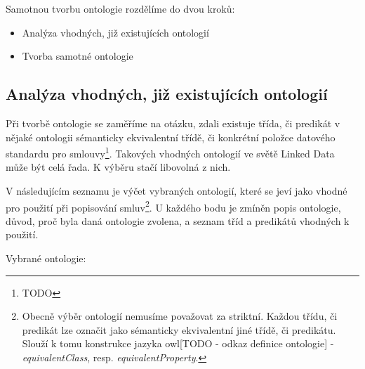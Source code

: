 \bigskip
\noindent
Samotnou tvorbu ontologie rozdělíme do dvou kroků:

\begin{itemize}
\item Analýza vhodných, již existujících ontologií
\item Tvorba samotné ontologie
\end{itemize}

\subsection{Analýza vhodných, již existujících ontologií}

Při tvorbě ontologie se zaměříme na otázku, zdali existuje třída, či predikát v nějaké ontologii sémanticky ekvivalentní třídě, či konkrétní položce datového standardu pro smlouvy\footnote{TODO}. Takových vhodných ontologií ve světě Linked Data může být celá řada. K výběru stačí libovolná z nich. 

V následujícím seznamu je výčet vybraných ontologií, které se jeví jako vhodné pro použití při popisování smluv\footnote{Obecně výběr ontologií nemusíme považovat za striktní. Každou třídu, či predikát lze označit jako sémanticky ekvivalentní jiné třídě, či predikátu. Slouží k tomu konstrukce jazyka owl[TODO - odkaz definice ontologie] - \textit{equivalentClass}, resp. \textit{equivalentProperty}.}. U každého bodu je zmíněn popis ontologie, důvod, proč byla daná ontologie zvolena, a seznam tříd a predikátů vhodných k použití.

\bigskip
\noindent
Vybrané ontologie:

